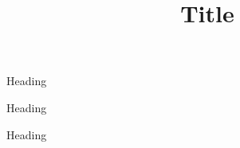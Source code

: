 \documentclass[aspectratio=169]{beamer}
\title{Title}
\begin{document}
\begin{frame}[plain]{}
    \maketitle
\end{frame}

\begin{frame}{Heading}
\end{frame}

\begin{frame}{Heading}
\end{frame}

\begin{frame}{Heading}
\end{frame}
\end{document}
